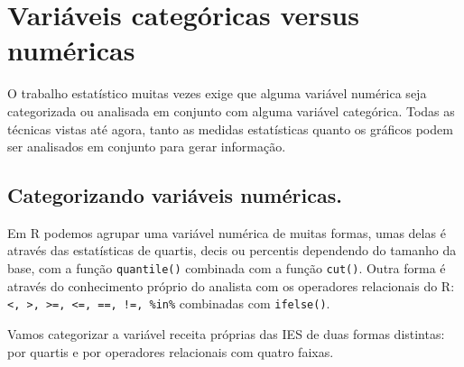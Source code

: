 \documentclass[12pt,]{style/krantz}
\makeatletter
\newenvironment{Shaded}{\begin{snugshade}}{\end{snugshade}}
\newcommand{\KeywordTok}[1]{\textcolor[rgb]{0.13,0.29,0.53}{\textbf{#1}}}
\newcommand{\DataTypeTok}[1]{\textcolor[rgb]{0.13,0.29,0.53}{#1}}
\newcommand{\DecValTok}[1]{\textcolor[rgb]{0.00,0.00,0.81}{#1}}
\newcommand{\StringTok}[1]{\textcolor[rgb]{0.31,0.60,0.02}{#1}}
\newcommand{\OtherTok}[1]{\textcolor[rgb]{0.56,0.35,0.01}{#1}}
\newcommand{\OperatorTok}[1]{\textcolor[rgb]{0.81,0.36,0.00}{\textbf{#1}}}
\newcommand{\NormalTok}[1]{#1}
\newenvironment{kframe}{%
\medskip{}
\setlength{\fboxsep}{.8em}
 \def\at@end@of@kframe{}%
 \ifinner\ifhmode%
  \def\at@end@of@kframe{\end{minipage}}%
  \begin{minipage}{\columnwidth}%
 \fi\fi%
 \def\FrameCommand##1{\hskip\@totalleftmargin \hskip-\fboxsep
 \colorbox{shadecolor}{##1}\hskip-\fboxsep
     \hskip-\linewidth \hskip-\@totalleftmargin \hskip\columnwidth}%
 \MakeFramed {\advance\hsize-\width
   \@totalleftmargin\z@ \linewidth\hsize
   \@setminipage}}%
 {\par\unskip\endMakeFramed%
 \at@end@of@kframe}
\renewenvironment{Shaded}{\begin{kframe}}{\end{kframe}}
\theoremstyle{definition}
\theoremstyle{definition}
\theoremstyle{definition}
\theoremstyle{remark}
\let\BeginKnitrBlock\begin \let\EndKnitrBlock\end
\makeatother
\begin{document}
\section{Variáveis categóricas versus
numéricas}\label{variaveis-categoricas-versus-numericas}

O trabalho estatístico muitas vezes exige que alguma variável numérica
seja categorizada ou analisada em conjunto com alguma variável
categórica. Todas as técnicas vistas até agora, tanto as medidas
estatísticas quanto os gráficos podem ser analisados em conjunto para
gerar informação.

\subsection{Categorizando variáveis
numéricas.}\label{categorizando-variaveis-numericas.}

Em R podemos agrupar uma variável numérica de muitas formas, umas delas
é através das estatísticas de quartis, decis ou percentis dependendo do
tamanho da base, com a função \texttt{quantile()} combinada com a função
\texttt{cut()}. Outra forma é através do conhecimento próprio do
analista com os operadores relacionais do R:
\texttt{\textless{},\ \textgreater{},\ \textgreater{}=,\ \textless{}=,\ ==,\ !=,\ \%in\%}
combinadas com \texttt{ifelse()}.

\BeginKnitrBlock{example}
\protect\hypertarget{exm:unnamed-chunk-79}{}{\label{exm:unnamed-chunk-79}
}Vamos categorizar a variável receita próprias das IES de duas formas
distintas: por quartis e por operadores relacionais com quatro faixas.
\EndKnitrBlock{example}

\begin{Shaded}
\end{Shaded}
\end{document}
